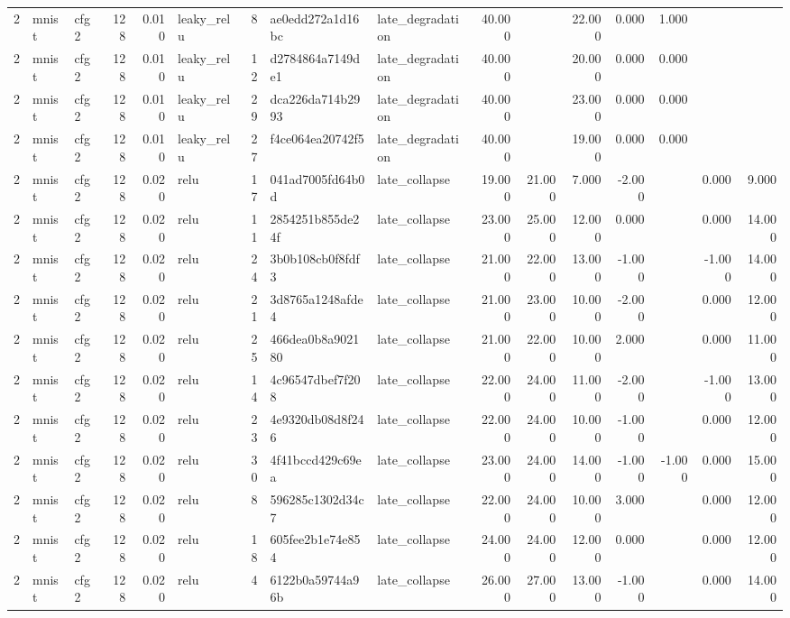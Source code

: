 \begin{table}[htbp]
{\begin{tabular}{@{}rllrrlrllrrrrrrr@{}}
2 & mnist & cfg2 & 128 & 0.010 & leaky\_relu & 8 & ae0edd272a1d16bc & late\_degradation & 40.000 &  & 22.000 & 0.000 & 1.000 &  &  \\
2 & mnist & cfg2 & 128 & 0.010 & leaky\_relu & 12 & d2784864a7149de1 & late\_degradation & 40.000 &  & 20.000 & 0.000 & 0.000 &  &  \\
2 & mnist & cfg2 & 128 & 0.010 & leaky\_relu & 29 & dca226da714b2993 & late\_degradation & 40.000 &  & 23.000 & 0.000 & 0.000 &  &  \\
2 & mnist & cfg2 & 128 & 0.010 & leaky\_relu & 27 & f4ce064ea20742f5 & late\_degradation & 40.000 &  & 19.000 & 0.000 & 0.000 &  &  \\
2 & mnist & cfg2 & 128 & 0.020 & relu & 17 & 041ad7005fd64b0d & late\_collapse & 19.000 & 21.000 & 7.000 & -2.000 &  & 0.000 & 9.000 \\
2 & mnist & cfg2 & 128 & 0.020 & relu & 11 & 2854251b855de24f & late\_collapse & 23.000 & 25.000 & 12.000 & 0.000 &  & 0.000 & 14.000 \\
2 & mnist & cfg2 & 128 & 0.020 & relu & 24 & 3b0b108cb0f8fdf3 & late\_collapse & 21.000 & 22.000 & 13.000 & -1.000 &  & -1.000 & 14.000 \\
2 & mnist & cfg2 & 128 & 0.020 & relu & 21 & 3d8765a1248afde4 & late\_collapse & 21.000 & 23.000 & 10.000 & -2.000 &  & 0.000 & 12.000 \\
2 & mnist & cfg2 & 128 & 0.020 & relu & 25 & 466dea0b8a902180 & late\_collapse & 21.000 & 22.000 & 10.000 & 2.000 &  & 0.000 & 11.000 \\
2 & mnist & cfg2 & 128 & 0.020 & relu & 14 & 4c96547dbef7f208 & late\_collapse & 22.000 & 24.000 & 11.000 & -2.000 &  & -1.000 & 13.000 \\
2 & mnist & cfg2 & 128 & 0.020 & relu & 23 & 4e9320db08d8f246 & late\_collapse & 22.000 & 24.000 & 10.000 & -1.000 &  & 0.000 & 12.000 \\
2 & mnist & cfg2 & 128 & 0.020 & relu & 30 & 4f41bccd429c69ea & late\_collapse & 23.000 & 24.000 & 14.000 & -1.000 & -1.000 & 0.000 & 15.000 \\
2 & mnist & cfg2 & 128 & 0.020 & relu & 8 & 596285c1302d34c7 & late\_collapse & 22.000 & 24.000 & 10.000 & 3.000 &  & 0.000 & 12.000 \\
2 & mnist & cfg2 & 128 & 0.020 & relu & 18 & 605fee2b1e74e854 & late\_collapse & 24.000 & 24.000 & 12.000 & 0.000 &  & 0.000 & 12.000 \\
2 & mnist & cfg2 & 128 & 0.020 & relu & 4 & 6122b0a59744a96b & late\_collapse & 26.000 & 27.000 & 13.000 & -1.000 &  & 0.000 & 14.000 \\

\end{tabular}}
\end{table}

